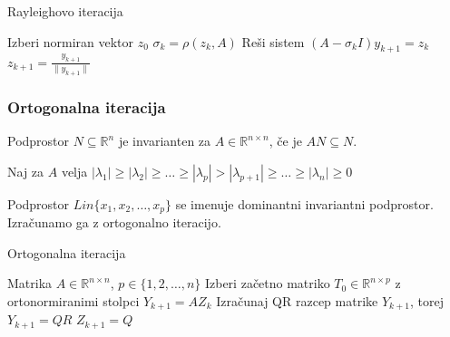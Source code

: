 \documentclass[a4paper,12pt]{article}
\theoremstyle{definition}
\theoremstyle{remark}
\newcommand{\R}{\mathbb{R}}
\begin{document}

\begin{algorithm}
    \caption{Rayleighovo iteracija}
    \begin{algorithmic}[1]
    \State Izberi normiran vektor $z_0$
        \State $\sigma_k = \rho(z_k, A)$
        \State Reši sistem $(A - \sigma_k I) y_{k+1} = z_k$
        \State $z_{k+1} = \frac{y_{k+1}}{\|y_{k+1}\|}$
    \EndWhile
    \end{algorithmic}
\end{algorithm}

\subsubsection{Ortogonalna iteracija}

Podprostor $N \subseteq \R^n$ je invarianten za $A \in \R^{n \times n}$, če je $A N \subseteq N$.

Naj za $A$ velja $|\lambda_1| \geq |\lambda_2| \geq \dots \geq |\lambda_p| > |\lambda_{p+1}| \geq \dots \geq |\lambda_n| \geq 0$

Podprostor $Lin\{x_1, x_2, \dots, x_p\}$ se imenuje dominantni invariantni podprostor. Izračunamo ga z ortogonalno iteracijo.


\begin{algorithm}
    \caption{Ortogonalna iteracija}
    \begin{algorithmic}[1]
    \Require Matrika $A \in \mathbb{R}^{n \times n}$, $p \in \{1, 2, \dots, n\}$
    \State Izberi začetno matriko $T_0 \in \mathbb{R}^{n \times p}$ z ortonormiranimi stolpci
        \State $Y_{k+1} = A Z_k$
        \State Izračunaj QR razcep matrike $Y_{k+1}$, torej $Y_{k+1} = QR$
        \State $Z_{k+1} = Q$
    \EndWhile
    \end{algorithmic}
\end{algorithm}
\end{document}
